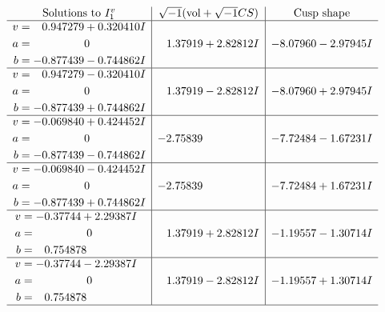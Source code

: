 \documentclass[1p]{elsarticle_modified}
\theoremstyle{definition}
\newcommand{\I}{\sqrt{-1}}
\begin{document}
$$\begin{array}{c|c|c}  
\text{Solutions to }I^v_{1}& \I (\text{vol} + \sqrt{-1}CS) & \text{Cusp shape}\\
 \hline 
\begin{aligned}
v &= \phantom{-}0.947279 + 0.320410 I \\
a &= \phantom{-0.000000 } 0 \\
b &= -0.877439 - 0.744862 I\end{aligned}
 & \phantom{-}1.37919 + 2.82812 I & -8.07960 - 2.97945 I \\ \hline\begin{aligned}
v &= \phantom{-}0.947279 - 0.320410 I \\
a &= \phantom{-0.000000 } 0 \\
b &= -0.877439 + 0.744862 I\end{aligned}
 & \phantom{-}1.37919 - 2.82812 I & -8.07960 + 2.97945 I \\ \hline\begin{aligned}
v &= -0.069840 + 0.424452 I \\
a &= \phantom{-0.000000 } 0 \\
b &= -0.877439 - 0.744862 I\end{aligned}
 & -2.75839\phantom{ +0.000000I} & -7.72484 - 1.67231 I \\ \hline\begin{aligned}
v &= -0.069840 - 0.424452 I \\
a &= \phantom{-0.000000 } 0 \\
b &= -0.877439 + 0.744862 I\end{aligned}
 & -2.75839\phantom{ +0.000000I} & -7.72484 + 1.67231 I \\ \hline\begin{aligned}
v &= -0.37744 + 2.29387 I \\
a &= \phantom{-0.000000 } 0 \\
b &= \phantom{-}0.754878\phantom{ +0.000000I}\end{aligned}
 & \phantom{-}1.37919 + 2.82812 I & -1.19557 - 1.30714 I \\ \hline\begin{aligned}
v &= -0.37744 - 2.29387 I \\
a &= \phantom{-0.000000 } 0 \\
b &= \phantom{-}0.754878\phantom{ +0.000000I}\end{aligned}
 & \phantom{-}1.37919 - 2.82812 I & -1.19557 + 1.30714 I\\
 \hline 
 \end{array}$$\newpage
\end{document}
